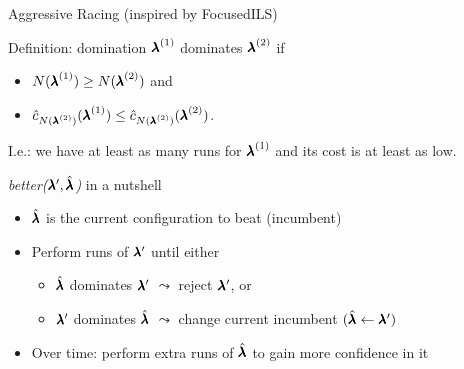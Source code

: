 \begin{frame}[c,fragile]{Aggressive Racing (inspired by FocusedILS) }


\begin{block}{Definition: domination}
\alert{${\pmb{\lambda}}^{(1)}$ dominates ${\pmb{\lambda}}^{(2)}$} if 
\begin{itemize}
\item $N({\pmb{\lambda}}^{(1)}) \ge N({\pmb{\lambda}}^{(2)})$ and 
\item $\hat{c}_{N({\pmb{\lambda}}^{(2)})}({\pmb{\lambda}}^{(1)}) \le \hat{c}_{N({\pmb{\lambda}}^{(2)})}({\pmb{\lambda}}^{(2)})$.
\end{itemize}
I.e.: we have at least as many runs for ${\pmb{\lambda}}^{(1)}$ and its cost is at least as low.
\end{block}

\pause

\begin{block}{\textit{better($\pmb{\lambda}', \hat{\pmb{\lambda}}$)} in a nutshell}
\begin{itemize}
\item $\hat{\pmb{\lambda}}$ is the current configuration to beat (incumbent)
\pause
\item Perform runs of $\pmb{\lambda}'$ until either
\begin{itemize}
\item $\hat{\pmb{\lambda}}$ dominates $\pmb{\lambda}'$ $\leadsto$ reject $\pmb{\lambda}'$, or
\item $\pmb{\lambda}'$ dominates $\hat{\pmb{\lambda}}$ $\leadsto$ change current incumbent $(\hat{\pmb{\lambda}} \leftarrow \pmb{\lambda}')$
\end{itemize}
\pause	
\item Over time: perform extra runs of $\hat{\pmb{\lambda}}$ to gain more confidence in it
\end{itemize}
\end{block}

\end{frame}



